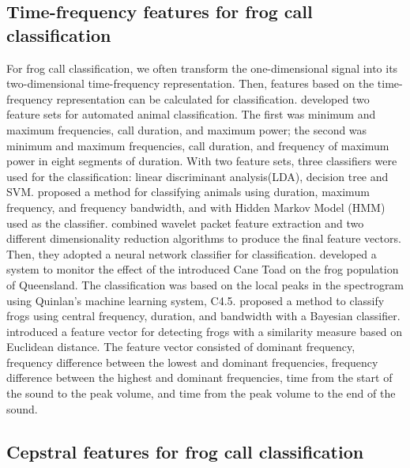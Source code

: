 \subsection{Time-frequency features for frog call classification}

For frog call classification, we often transform the one-dimensional signal into its two-dimensional time-frequency representation. Then, features based on the time-frequency representation can be calculated for classification.
\cite{acevedo2009automated} developed two feature sets for automated animal classification. The first was minimum and maximum frequencies, call duration, and maximum power; the second was minimum and maximum frequencies, call duration, and frequency of maximum power in eight segments of duration. With two feature sets, three classifiers were used for the classification: linear discriminant analysis(LDA), decision tree and SVM. \cite{brandes2008feature} proposed a method for classifying animals using duration, maximum frequency, and frequency bandwidth, and with Hidden Markov Model (HMM) used as the classifier.  \cite{yen2002automatic} combined wavelet packet feature extraction and two different dimensionality reduction algorithms to produce the final feature vectors. Then, they adopted a neural network classifier for classification. \cite{grigg1996monitoring} developed a system to monitor the effect of the introduced Cane Toad on the frog population of Queensland. The classification was based on the local peaks in the spectrogram using Quinlan's machine learning system, C4.5. \cite{Brandes2006} proposed a method to classify frogs using central frequency, duration, and bandwidth with a Bayesian classifier. \cite{croker2012using} introduced a feature vector for detecting frogs with a similarity measure based on Euclidean distance. The feature vector consisted of dominant frequency, frequency difference between the lowest and dominant frequencies, frequency difference between the highest and dominant frequencies, time from the start of the sound to the peak volume, and time from the peak volume to the end of the sound. 
 


\subsection{Cepstral features for frog call classification}

